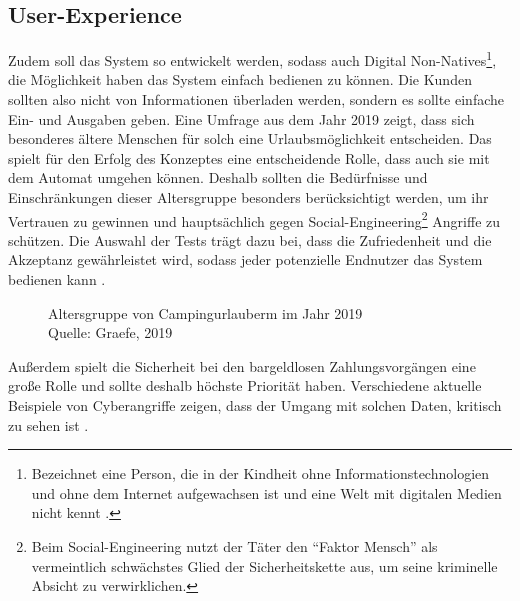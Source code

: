 \subsection{User-Experience}
Zudem soll das System so entwickelt werden, sodass auch Digital Non-Natives\footnote{Bezeichnet
eine Person, die in der Kindheit ohne Informationstechnologien und ohne dem Internet aufgewachsen ist 
und eine Welt mit digitalen Medien nicht kennt \cite{misc:MSND}.}, die Möglichkeit \cite{refart:QWDN} haben
das System einfach bedienen zu können. Die Kunden sollten also nicht von Informationen überladen werden, 
sondern es sollte einfache Ein- und Ausgaben geben. Eine Umfrage aus dem Jahr 2019 \cite{periodical:AdCJ}
zeigt, dass sich besonderes ältere Menschen \cite{periodical:AdCJ} für solch eine Urlaubsmöglichkeit entscheiden.
Das spielt für den Erfolg des Konzeptes eine entscheidende Rolle, dass auch sie mit dem Automat umgehen können. 
Deshalb sollten die Bedürfnisse und Einschränkungen dieser Altersgruppe besonders berücksichtigt werden, um ihr 
Vertrauen zu gewinnen \cite{refart:HLAU} und hauptsächlich gegen Social-Engineering\footnote{Beim Social-Engineering 
nutzt der Täter den ``Faktor Mensch'' als vermeintlich schwächstes Glied der Sicherheitskette aus, um seine kriminelle
Absicht zu verwirklichen.\cite{booklet:BSSE}} Angriffe zu schützen. Die Auswahl der Tests trägt dazu bei, dass die 
Zufriedenheit und die Akzeptanz gewährleistet wird, sodass jeder potenzielle Endnutzer das System bedienen kann 
\cite{refbook:IASE}.


\vfill
\begin{figure}[H]
    \caption{Altersgruppe von Campingurlauberm im Jahr 2019 \\ Quelle: Graefe, 2019}
    \label{fig:periodical_AdCJ}
\end{figure}


Außerdem spielt die Sicherheit bei den bargeldlosen Zahlungsvorgängen eine große Rolle und sollte deshalb 
höchste Priorität haben. Verschiedene aktuelle Beispiele von Cyberangriffe zeigen, dass der Umgang mit
solchen Daten, kritisch zu sehen ist \cite{booklet:BKCB}. 

